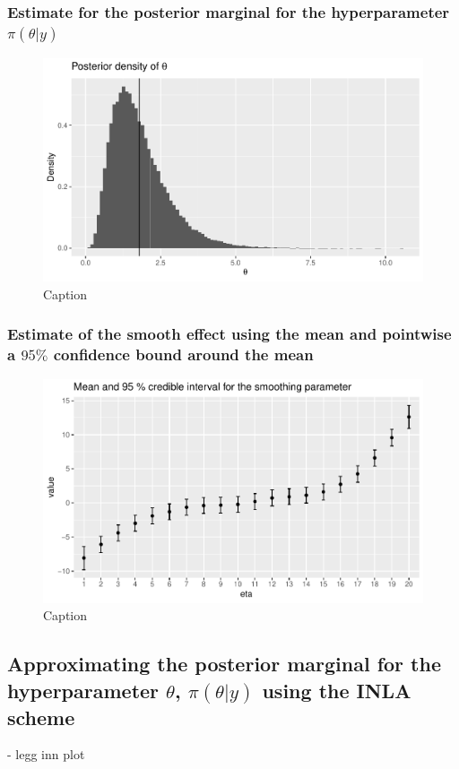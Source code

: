 \subsubsection{Estimate for the posterior marginal for the hyperparameter $\pi(\theta|y)$}
\begin{figure}[h]
    \centering
    \includegraphics[width=\textwidth]{Images/post_theta_mcmc.pdf}
    \caption{Caption}
    \label{fig:post_theta_mcmc}
\end{figure}

\subsubsection{Estimate of the smooth effect using the mean and pointwise a $95 \%$ confidence bound around the mean}
\begin{figure}
    \centering
    \includegraphics[width=\textwidth]{Images/post_eta_mcmc.pdf}
    \caption{Caption}
    \label{fig:post_eta_mcmc}
\end{figure}

\subsection{Approximating the posterior marginal for the hyperparameter $\theta$, $\pi(\theta|y)$ using the INLA scheme}
 - legg inn plot 
 
